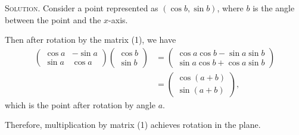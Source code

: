 \documentclass{article}[12pt, a4paper]
\newenvironment{solution}{\par\noindent\textsc{Solution. }}{\\\\\par}
\begin{document}
\begin{solution}
Consider a point represented as $(\cos{b}, \sin{b})$, where $b$ is the angle between the point and the $x$-axis.

Then after rotation by the matrix (1), we have
$$
\begin{aligned}
\begin{pmatrix}
    \cos{a} & -\sin a \\
    \sin a & \cos a
\end{pmatrix}
\begin{pmatrix}
    \cos b \\
    \sin b
\end{pmatrix} &= 
\begin{pmatrix}
    \cos{a}\cos{b} - \sin{a}\sin{b} \\
    \sin{a}\cos{b} + \cos{a}\sin{b}
\end{pmatrix} \\
&= 
\begin{pmatrix}
    \cos{(a+b)} \\
    \sin{(a+b)}
\end{pmatrix},
\end{aligned}
$$
which is the point after rotation by angle $a$.

Therefore, multiplication by matrix (1) achieves rotation in the plane.
\end{solution}
\end{document}
